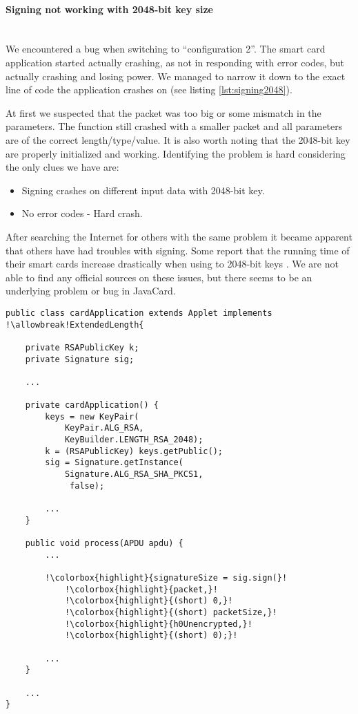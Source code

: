 \paragraph{Signing not working with 2048-bit key size}\mbox{}\\
We encountered a bug when switching to ``configuration 2''. The smart card application started actually crashing, as not in responding with error codes, but actually crashing and losing power. We managed to narrow it down to the exact line of code the application crashes on (see listing \ref{lst:signing2048}).

At first we suspected that the packet was too big or some mismatch in the parameters. The function still crashed with a smaller packet and all parameters are of the correct length/type/value. It is also worth noting that the 2048-bit key are properly initialized and working. Identifying the problem is hard considering the only clues we have are:

\begin{itemize}
    \item Signing crashes on different input data with 2048-bit key.
    \item No error codes - Hard crash.
\end{itemize}

After searching the Internet for others with the same problem it became apparent that others have had troubles with signing. Some report that the running time of their smart cards increase drastically when using to 2048-bit keys \cite{signingtrouble2}. We are not able to find any official sources on these issues, but there seems to be an underlying problem or bug in JavaCard.

\begin{lstlisting}[caption=Java Card failed signing., label=lst:signing2048, escapechar=!]
public class cardApplication extends Applet implements !\allowbreak!ExtendedLength{

    private RSAPublicKey k;
    private Signature sig;

    ...

    private cardApplication() {
        keys = new KeyPair(
            KeyPair.ALG_RSA,
            KeyBuilder.LENGTH_RSA_2048);
        k = (RSAPublicKey) keys.getPublic();
    	sig = Signature.getInstance(
            Signature.ALG_RSA_SHA_PKCS1,
             false);

        ...
    }

    public void process(APDU apdu) {
    	...

        !\colorbox{highlight}{signatureSize = sig.sign(}!
            !\colorbox{highlight}{packet,}!
            !\colorbox{highlight}{(short) 0,}!
            !\colorbox{highlight}{(short) packetSize,}!
            !\colorbox{highlight}{h0Unencrypted,}!
            !\colorbox{highlight}{(short) 0);}!

        ...
    }

    ...
}
\end{lstlisting}

